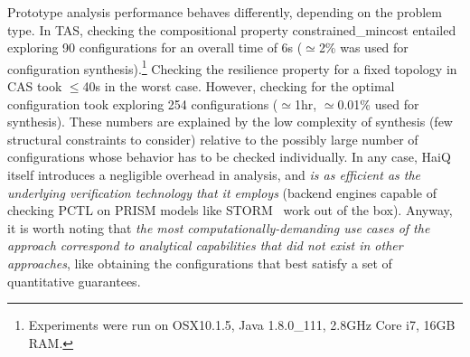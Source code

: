 \documentclass[10pt,journal,compsoc]{IEEEtran}
\begin{document}
\smallskip 
{} Prototype analysis performance behaves differently, depending on the problem type. 
In TAS, checking the compositional property {\sf constrained\_mincost} entailed exploring 90 configurations for an overall time of 6s ($\simeq$2\% was used for configuration synthesis).\footnote{Experiments were run on OSX10.1.5, Java 1.8.0\_111, 2.8GHz Core i7, 16GB RAM.}
Checking the {\sf resilience} property for a fixed topology in CAS took $\leq$40s in the worst case. However, checking for the optimal configuration took exploring 254 configurations ($\simeq$1hr, $\simeq$0.01\% used for synthesis). 
These numbers are explained by the low complexity of synthesis (few structural constraints to consider) relative to the possibly large number of configurations whose behavior has to be checked individually.
In any case, {\sf HaiQ} itself introduces a negligible overhead in analysis, and {\it is as efficient as the underlying verification technology that it employs} (backend engines capable of checking PCTL on PRISM models like STORM~\cite{DBLP:journals/corr/DehnertJK017} work out of the box). 
Anyway, it is worth noting that {\it the most computationally-demanding use cases of the approach correspond to analytical capabilities that did not exist in other approaches}, like obtaining the configurations that best satisfy a set of quantitative guarantees. 
\end{document}
